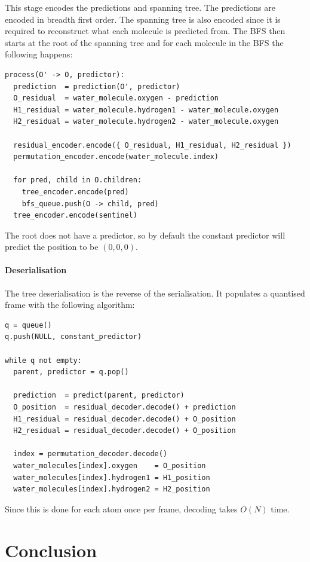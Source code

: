 \documentclass[a4paper]{report}
\begin{document}
This stage encodes the predictions and spanning tree. The predictions are
encoded in breadth first order. The spanning tree is also encoded since it is
required to reconstruct what each molecule is predicted from. The BFS then
starts at the root of the spanning tree and for each molecule in the BFS the
following happens:

\begin{verbatim}
process(O' -> O, predictor):
  prediction  = prediction(O', predictor)
  O_residual  = water_molecule.oxygen - prediction
  H1_residual = water_molecule.hydrogen1 - water_molecule.oxygen
  H2_residual = water_molecule.hydrogen2 - water_molecule.oxygen

  residual_encoder.encode({ O_residual, H1_residual, H2_residual })
  permutation_encoder.encode(water_molecule.index)

  for pred, child in O.children:
    tree_encoder.encode(pred)
    bfs_queue.push(O -> child, pred)
  tree_encoder.encode(sentinel)
\end{verbatim}

The root does not have a predictor, so by default the constant predictor will
predict the position to be $(0,0,0)$.


\paragraph{Deserialisation}

The tree deserialisation is the reverse of the serialisation. It populates a
quantised frame with the following algorithm:

\begin{verbatim}
q = queue()
q.push(NULL, constant_predictor)

while q not empty:
  parent, predictor = q.pop()

  prediction  = predict(parent, predictor)
  O_position  = residual_decoder.decode() + prediction
  H1_residual = residual_decoder.decode() + O_position
  H2_residual = residual_decoder.decode() + O_position

  index = permutation_decoder.decode()
  water_molecules[index].oxygen    = O_position
  water_molecules[index].hydrogen1 = H1_position
  water_molecules[index].hydrogen2 = H2_position
\end{verbatim}

Since this is done for each atom once per frame, decoding takes $O(N)$ time.


\section{Conclusion}
\end{document}
